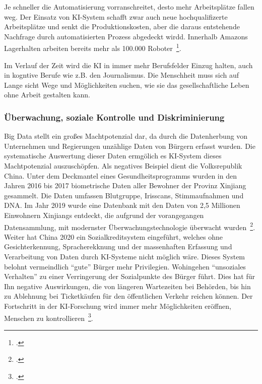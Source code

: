 Je schneller die Automatisierung vorranschreitet, desto mehr Arbeitsplätze fallen weg. Der Einsatz von \ac{KI}-System schafft zwar auch neue hochqualifizerte 
Arbeitsplätze und senkt die Produktionskosten, aber die daraus entstehende Nachfrage durch automatisierten Prozess abgedeckt wirdd.
Innerhalb Amazons Lagerhalten arbeiten bereits mehr als 100.000 Roboter~\footcite[\vglf][]{Kipper.2020}.

Im Verlauf der Zeit wird die \ac{KI} in immer mehr Berufsfelder Einzug halten, auch in kogntive Berufe wie z.B. den Journalismus. Die Menschheit muss sich 
auf Lange sicht Wege und Möglichkeiten suchen, wie sie das gesellschaftliche Leben ohne Arbeit gestalten kann.
    
\subsubsection{Überwachung, soziale Kontrolle und Diskriminierung}

Big Data stellt ein großes Machtpotenzial dar, da durch die Datenherbung von Unternehmen und Regierungen unzählige Daten von Bürgern erfasst wurden. Die systematische 
Auswertung dieser Daten ermgölich es \ac{KI}-System dieses Machtpotenzial auszuschöpfen.
Als negatives Beispiel dient die Volksrepublik China. Unter dem Deckmantel eines Gesundheitsprogramms wurden in den Jahren 2016 bis 2017 biometrische Daten aller
Bewohner der Provinz Xinjiang gesammelt. Die Daten umfassen Blutgruppe, Irisscans, Stimmaufnahmen und DNA. Im Jahr 2019 wurde eine Datenbank mit den Daten von 2,5 Millionen
Einwohnern Xinjiangs entdeckt, die aufgrund der vorangegangen Datensammlung, mit modernster Überwachungstechnologie überwacht wurden~\footcite[\vglf][]{Kipper.2020}.
Weiter hat China 2020 ein Sozialkreditsystem eingeführt, welches ohne Gesichterkennung, Spracherekknung und der massenhaften Erfassung und Verarbeitung von Daten durch
\ac{KI}-Systeme nicht möglich wäre. Dieses System belohnt vermeindlich \enquote{gute} Bürger mehr Privilegien. Wohingehen \enquote{unsoziales Verhalten} zu einer Verringerung der
Sozialpunkte des Bürger führt. Dies hat für Ihn negative Auswirkungen, die von längeren Wartezeiten bei Behörden, bis hin zu Ablehnung bei Ticketkäufen für den öffentlichen Verkehr
reichen können. Der Fortschritt in der \ac{KI}-Forschung wird immer mehr Möglichkeiten eröffnen, Menschen zu kontrollieren~\footcite[\vglf][]{Kipper.2020}.

